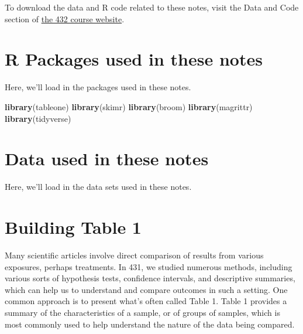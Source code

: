 \documentclass[]{book}
\newenvironment{Shaded}{\begin{snugshade}}{\end{snugshade}}
\newcommand{\KeywordTok}[1]{\textcolor[rgb]{0.13,0.29,0.53}{\textbf{#1}}}
\newcommand{\StringTok}[1]{\textcolor[rgb]{0.31,0.60,0.02}{#1}}
\newcommand{\OperatorTok}[1]{\textcolor[rgb]{0.81,0.36,0.00}{\textbf{#1}}}
\newcommand{\NormalTok}[1]{#1}
\theoremstyle{definition}
\theoremstyle{definition}
\theoremstyle{definition}
\theoremstyle{remark}
\begin{document}
To download the data and R code related to these notes, visit the Data
and Code section of \href{https://github.com/THOMASELOVE/432-2018}{the
432 course website}.

\chapter*{R Packages used in these
notes}\label{r-packages-used-in-these-notes}

Here, we'll load in the packages used in these notes.

\begin{Shaded}
\begin{Highlighting}[]
\KeywordTok{library}\NormalTok{(tableone)}
\KeywordTok{library}\NormalTok{(skimr)}
\KeywordTok{library}\NormalTok{(broom)}
\KeywordTok{library}\NormalTok{(magrittr)}
\KeywordTok{library}\NormalTok{(tidyverse)}
\end{Highlighting}
\end{Shaded}

\chapter*{Data used in these notes}\label{data-used-in-these-notes}

Here, we'll load in the data sets used in these notes.

\begin{Shaded}
\end{Shaded}

\chapter{Building Table 1}\label{building-table-1}

Many scientific articles involve direct comparison of results from
various exposures, perhaps treatments. In 431, we studied numerous
methods, including various sorts of hypothesis tests, confidence
intervals, and descriptive summaries, which can help us to understand
and compare outcomes in such a setting. One common approach is to
present what's often called Table 1. Table 1 provides a summary of the
characteristics of a sample, or of groups of samples, which is most
commonly used to help understand the nature of the data being compared.
\end{document}
